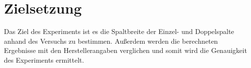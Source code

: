 \section{Zielsetzung}
Das Ziel des Experiments ist es die Spaltbreite der Einzel- und Doppelspalte anhand des Versuchs zu bestimmen.
Außerdem werden die berechneten Ergebnisse mit den Herstellerangaben verglichen und somit wird die Genauigkeit des Experiments ermittelt.